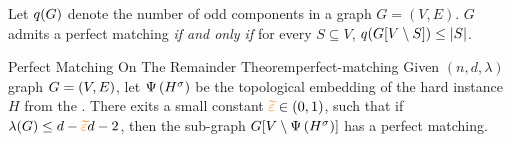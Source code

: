 \documentclass[11pt]{article}
\newcommand{\EnDeeLambda}{(n, d, \lambda)}
\newcommand{\Subdivision}[2]{{#1}^{#2}}
\newcommand{\ExpansionFactor}[1]{\lambda(#1)}
\begin{document}


\begin{lemma}\label{lemma:tutte-criterion}
Let $q(G)$ denote the number of odd components in a graph $G=(V,E)$. 
$G$ admits a perfect matching \emph{if and only if} for every $S \subseteq V$, $q(G[V \setminus S]) \leq |S|$.
\end{lemma}


\begin{theorem}{Perfect Matching On The Remainder Theorem}{perfect-matching}
Given $\EnDeeLambda$ graph $G=(V,E)$, let $\Embedding{\Subdivision{H}{\sigma}}$ be the topological embedding of the hard instance $H$ from the .
There exits a small constant $\textcolor{orange}{\widetilde{\varepsilon}} \in (0,1)$, such that 
if $\ExpansionFactor{G} \leq d - \PartitionEps d - 2$, then the sub-graph $\Graph[V \setminus \Embedding{\Subdivision{H}{\sigma}}]$ has a perfect matching.	
	
\end{theorem}
\end{document}
